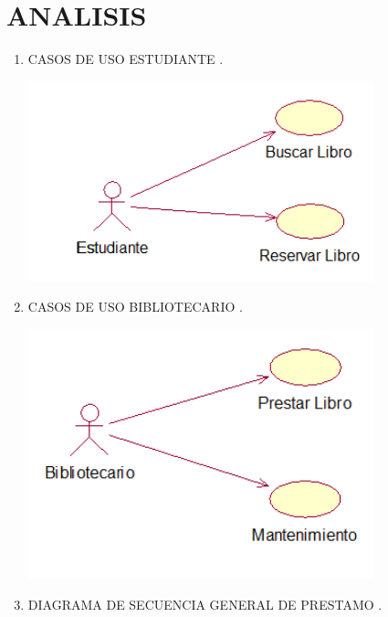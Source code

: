 \section{ANALISIS} 

\begin{enumerate}[1.]
	\item CASOS DE USO ESTUDIANTE .\\
	
    


	\begin{center}
	
	\includegraphics[width=10cm]{./Imagenes/img1} 
	\end{center}
	\item CASOS DE USO BIBLIOTECARIO .\\
	\begin{center}
	\includegraphics[width=10cm]{./Imagenes/img2} 
	\end{center}
    \newpage
   	 \item DIAGRAMA DE SECUENCIA GENERAL DE PRESTAMO .\\
	\begin{center}

\end{center}
\end{enumerate}
